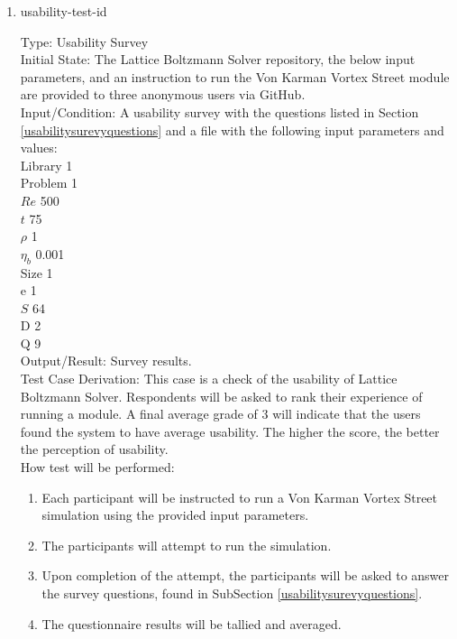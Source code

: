 \documentclass[12pt, titlepage]{article}
\newcommand{\famname}{Lattice Boltzmann Solver}
\newcounter{testcounter} %
\begin{document}
\begin{enumerate}

\item{usability-test-id\thetestcounter \\}

Type: Usability Survey\\
					
Initial State: The {\famname} repository, the below input parameters, and an
instruction to run the Von Karman Vortex Street module are provided to three
anonymous users via GitHub.\\
					
Input/Condition: A usability survey with the questions listed in Section
\ref{usabilitysurevyquestions} and a file with the following
input parameters and values:\\
Library 1\\
Problem 1\\
$Re$ 500\\
$t$ 75\\
$\rho$ 1\\
$\eta_b$ 0.001\\
Size 1\\
$\mathrm{e}$ 1\\
$S$ 64\\
$\mathrm{D}$ 2\\
$\mathrm{Q}$ 9\\

				
Output/Result: Survey results.\\

Test Case Derivation: This case is a check of the usability of
{\famname}. Respondents will be asked to rank their experience of running a
module. A final average grade of 3 will indicate that the users found the system
to have average usability. The higher the score, the better the perception of
usability.\\
	
How test will be performed: 

\begin{enumerate}
\item Each participant will be instructed to run a Von Karman Vortex Street
simulation using the provided input parameters.
\item The participants will attempt to run the simulation.
\item Upon completion of the attempt, the participants will be asked to answer
the survey questions, found in SubSection \ref{usabilitysurevyquestions}. %
\item The questionnaire results will be tallied and averaged.
\end{enumerate}

\end{enumerate}
\end{document}
